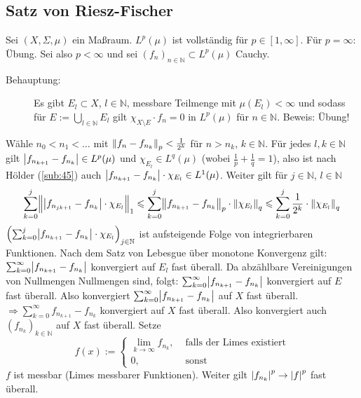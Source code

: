\subsection{Satz von Riesz-Fischer} %
\label{sub:411}
Sei $(X,\Sigma,\mu)$ ein Maßraum. $L^p(\mu)$ ist vollständig für $p \in [1,\infty]$.
Für $p=\infty$: Übung. Sei also $p <\infty$ und sei $(f_n)_{n \in \mathds{N}} \subset L^p(\mu)$ Cauchy.
\begin{description}
	\item[Behauptung:] Es gibt $E_l \subset X$, $l \in \mathds{N}$, messbare Teilmenge mit $\mu(E_l) <\infty$ und sodass für $E := \bigcup_{l \in \mathds{N}} E_l$ gilt 
	$\chi_{X \setminus E} \cdot f_n = 0$ in $L^p(\mu)$ für $n \in \mathds{N}$. Beweis: Übung!
\end{description}
Wähle $n_0 < n_1 < \ldots $ mit $\norm[p]{f_n - f_{n_k}} < \frac{1}{2^k}$ für $n > n_k$, $k \in \mathds{N}$. Für jedes $l,k \in \mathds{N}$ gilt
$\abs*{f_{n_{k+1}} - f_{n_k}} \in L^p(\mu)$ und $\chi_{E_l} \in L^q(\mu)$ (wobei $\frac{1}{p} + \frac{1}{q}=1$), also ist nach Hölder (\ref{sub:45}) auch
\(
	\abs*{f_{n_{k+1}} - f_{n_k}} \cdot \chi_{E_l} \in L^1(\mu)
\).
Weiter gilt für $j \in \mathds{N}$, $l \in \mathds{N}$
\[
	\sum_{k=0}^{j}  \doppelstrich[\Big]{\abs*{f_{n_{jk+1}}- f_{n_k}} \cdot \chi_{E_l}}_{1}
	\le \sum_{k=0}^{j} \norm[p]{f_{n_{k+1}}- f_{n_k}} \cdot \norm[q]{\chi_{E_l}} \le \sum_{k=0}^{j} \frac{1}{2^k} \cdot \norm[q]{\chi_{E_l}}
\]
$\enbrace*{\sum_{k=0}^{j} \abs*{f_{n_{k+1}} - f_{n_k}} \cdot \chi_{E_l}}_{j \in \mathds{N}}$ ist aufsteigende Folge von integrierbaren Funktionen. Nach dem Satz von
Lebesgue über monotone Konvergenz gilt: $\sum_{k=0}^{\infty} \abs*{f_{n_{k+1}} - f_{n_k}} $ konvergiert auf $E_l$ fast überall. Da abzählbare Vereinigungen von Nullmengen
Nullmengen sind, folgt: $\sum_{k=0}^{\infty} \abs*{f_{n_{k+1}}- f_{n_k}}$ konvergiert auf $E$ fast überall. Also konvergiert $\sum_{k=0}^{\infty} \abs*{f_{n_{k+1}}- f_{n_k}}$
auf $X$ fast überall. $\Rightarrow \sum_{k=0}^{\infty} f_{n_{k+1}}- f_{n_k}$ konvergiert auf $X$ fast überall. Also konvergiert auch $(f_{n_k})_{k \in \mathds{N}}$ auf
$X$ fast überall. Setze
\[
	f(x) := \begin{cases}
		\lim_{k\to \infty} f_{n_k}, &\text{ falls der Limes existiert}\\
		0, &\text{ sonst}
	\end{cases}
\]
$f$ ist messbar (Limes messbarer Funktionen). Weiter gilt $\abs*{f_{n_k}}^p \to \abs*{f}^p$ fast überall. 

